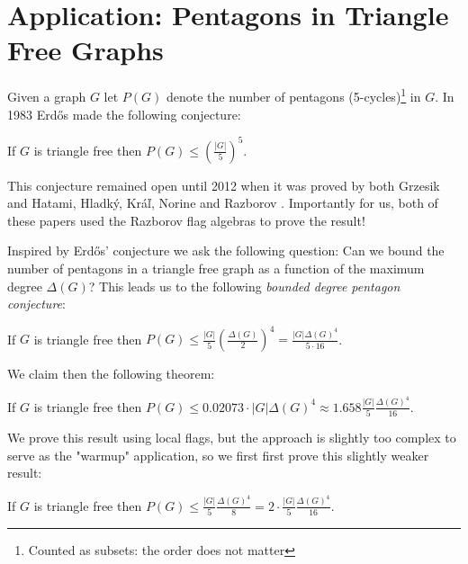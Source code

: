 \chapter{Application: Pentagons in Triangle Free Graphs}
\label{chap:pentagon_conjecture}

Given a graph $G$ let $P(G)$ denote the number of pentagons (5-cycles)\footnote{Counted as
subsets: the order does not matter} in $G$.
In 1983 \cite{erdosProblemsGraphTheory1984} Erd\H{o}s made the following conjecture:

\begin{knownconjecture}[Erd\H{o}s 1983]
    If $G$ is triangle free then $P(G) \leq \left(\frac{|G|}{5}\right)^5$.
\end{knownconjecture}

This conjecture remained open until 2012 when it was proved by both Grzesik
\cite{grzesikMaximumNumberFivecycles2012} and Hatami, Hladký, Kráľ, Norine and Razborov
\cite{hatamiNumberPentagonsTrianglefree2013}. 
Importantly for us, both of these papers used the Razborov flag algebras to prove the result!

Inspired by Erd\H{o}s' conjecture we ask
the following question: Can we bound the number of pentagons in a triangle free graph
as a function of the maximum degree $\Delta(G)$?
This leads us to the following \textit{bounded degree pentagon conjecture}:

\begin{conjecture}
    \label{conj:bounded_pentagon}
    If $G$ is triangle free then 
    $P(G) \leq \frac{|G|}{5}\left(\frac{\Delta(G)}{2}\right)^4
    =\frac{|G|\Delta(G)^4}{5\cdot 16}$.
\end{conjecture}

We claim then the following theorem:
\begin{theorem}
    \label{thm:full_pentagon_bound}
    If $G$ is triangle free then
    $P(G) \leq 0.02073 \cdot |G|\Delta(G)^4 \approx 1.658\frac{|G|}{5}\frac{\Delta(G)^4}{16}$.
\end{theorem}

We prove this result using local flags, but the approach is slightly too complex to serve
as the "warmup" application, so we first first prove this slightly weaker result:

\begin{theorem}
    \label{thm:simple_pentagon_bound}
    If $G$ is triangle free then
    $P(G) \leq \frac{|G|}{5}\frac{\Delta(G)^4}{8} = 2\cdot\frac{|G|}{5}\frac{\Delta(G)^4}{16}$.
\end{theorem}

